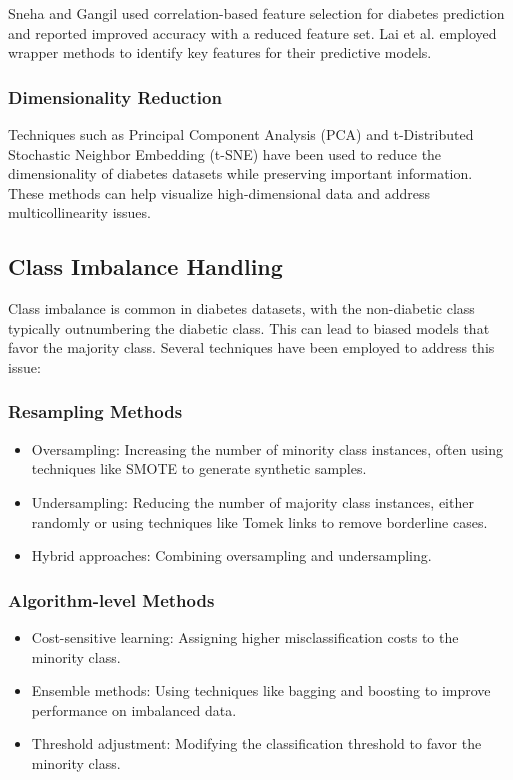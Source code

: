 \documentclass[journal]{IEEEtran}
\begin{document}
Sneha and Gangil \cite{sneha2019} used correlation-based feature selection for diabetes prediction and reported improved accuracy with a reduced feature set. Lai et al. \cite{lai2019} employed wrapper methods to identify key features for their predictive models.

\subsubsection{Dimensionality Reduction}
Techniques such as Principal Component Analysis (PCA) and t-Distributed Stochastic Neighbor Embedding (t-SNE) have been used to reduce the dimensionality of diabetes datasets while preserving important information. These methods can help visualize high-dimensional data and address multicollinearity issues.

\subsection{Class Imbalance Handling}
Class imbalance is common in diabetes datasets, with the non-diabetic class typically outnumbering the diabetic class. This can lead to biased models that favor the majority class. Several techniques have been employed to address this issue:

\subsubsection{Resampling Methods}
\begin{itemize}
    \item Oversampling: Increasing the number of minority class instances, often using techniques like SMOTE to generate synthetic samples.
    \item Undersampling: Reducing the number of majority class instances, either randomly or using techniques like Tomek links to remove borderline cases.
    \item Hybrid approaches: Combining oversampling and undersampling.
\end{itemize}

\subsubsection{Algorithm-level Methods}
\begin{itemize}
    \item Cost-sensitive learning: Assigning higher misclassification costs to the minority class.
    \item Ensemble methods: Using techniques like bagging and boosting to improve performance on imbalanced data.
    \item Threshold adjustment: Modifying the classification threshold to favor the minority class.
\end{itemize}
\end{document}
